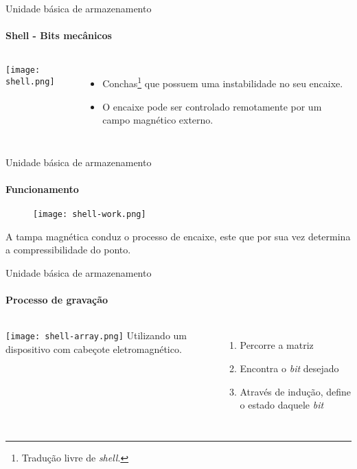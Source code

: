 \begin{frame}[t]{Unidade básica de armazenamento}
    \transboxout[duration=0.5]
    \framesubtitle{Shell - Bits mecânicos}
    \begin{columns}
            \texttt{[image: shell.png]}
            \begin{itemize}
                \item Conchas\footnote{Tradução livre de \textit{shell}.} que possuem uma instabilidade no seu encaixe.
                \item O encaixe pode ser controlado remotamente por um campo magnético externo.
            
            \end{itemize}
    \end{columns}
    
\end{frame}

\begin{frame}[t]{Unidade básica de armazenamento}
    \transboxout[duration=0.5]
    \framesubtitle{Funcionamento}
    
    \begin{figure}
        \texttt{[image: shell-work.png]}
    \end{figure}
    \small
    A tampa magnética conduz o processo de encaixe, este que por sua vez determina a compressibilidade do ponto. 
\end{frame}

\begin{frame}[t]{Unidade básica de armazenamento}
    \transboxout[duration=0.5]
    \framesubtitle{Processo de gravação}
    \begin{columns}
            \texttt{[image: shell-array.png]}
        Utilizando um dispositivo com cabeçote eletromagnético.
            \begin{enumerate}
                \item Percorre a matriz
                \item Encontra o \textit{bit} desejado
                \item Através de indução, define o estado daquele \textit{bit}
            
            \end{enumerate}
        
    \end{columns}
    
\end{frame}